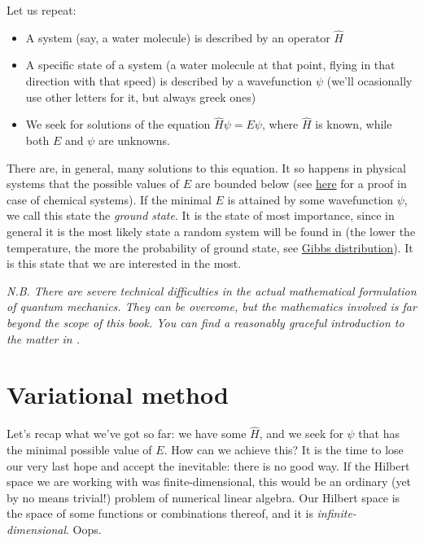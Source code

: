 \documentclass{article}
\begin{document}
Let us repeat:
\begin{itemize}
\item A system (say, a water molecule) is described by an operator \(\hat H\)
\item A specific state of a system (a water molecule at that point, flying in that direction with that speed) is described by a wavefunction \(\psi\) (we'll ocasionally use other letters for it, but always greek ones)
\item We seek for solutions of the equation \(\hat H \psi = E \psi\), where \(\hat H\) is known, while both \(E\) and \(\psi\) are unknowns. 
\end{itemize}

There are, in general, many solutions to this equation. It so happens in physical systems that the possible values of \(E\) are bounded below (see \href{https://www.themathcitadel.com/energy-levels-of-molecules-are-bounded-below/}{here} for a proof in case of chemical systems). If the minimal \(E\) is attained by some wavefunction \(\psi\), we call this state the \textit{ground state}. It is the state of most importance, since in general it is the most likely state a random system will be found in (the lower the temperature, the more the probability of ground state, see \href{https://en.wikipedia.org/wiki/Boltzmann_distribution}{Gibbs distribution}). It is this state that we are interested in the most.

\textit{N.B. There are severe technical difficulties in the actual mathematical formulation of quantum mechanics. They can be overcome, but the mathematics involved is far beyond the scope of this book. You can find a reasonably graceful introduction to the matter in \cite{ref:hall}.}

\newpage

\section{Variational method} \label{sec:var}

Let's recap what we've got so far: we have some \(\hat H\), and we seek for \(\psi\) that has the minimal possible value of \(E\). How can we achieve this? It is the time to lose our very last hope and accept the inevitable: there is no good way. If the Hilbert space we are working with was finite-dimensional, this would be an ordinary (yet by no means trivial!) problem of numerical linear algebra. Our Hilbert space is the space of some functions or combinations thereof, and it is \textit{infinite-dimensional}. Oops.
\end{document}
